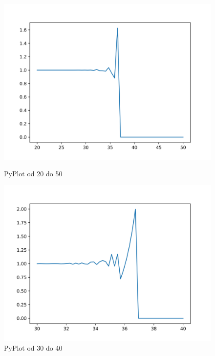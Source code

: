 \documentclass[12pt]{article}
\begin{document}
\begin{figure}[!htb]
  \includegraphics[width=\linewidth]{zad2_plot_py2.png}
  \caption{PyPlot od 20 do 50}\label{fig:figure1}
\endminipage\hfill
{}
  \includegraphics[width=\linewidth]{zad2_plot_py.png}
  \caption{PyPlot od 30 do 40}\label{fig:figure2}
\endminipage
\end{figure}
\end{document}
